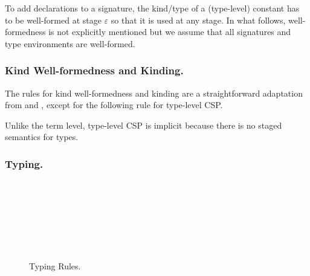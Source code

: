 To add declarations to a signature, the kind/type of a (type-level)
constant has to be well-formed at stage \(\varepsilon\) so that it is
used at any stage.  In what follows, well-formedness is not explicitly
mentioned but we assume that all signatures and type environments are
well-formed.

\subsubsection{Kind Well-formedness and Kinding.}

The rules for kind well-formedness and kinding are a straightforward
adaptation from \LLF and \LTP, except for the following rule for type-level CSP.
\begin{center}
\end{center}
Unlike the term level, type-level CSP is implicit because there is no staged
semantics for types.

\subsubsection{Typing.}

\begin{figure}[tbp]
  \begin{center}
     \hfil
     \\[2mm]
     \\[2mm]
     \\[2mm]
     \\[2mm]
     \andalso
     \\[2mm]
     \\[2mm]
     \andalso
    \caption{Typing Rules.}
    \label{fig:typing-rules}
  \end{center}
\end{figure}

